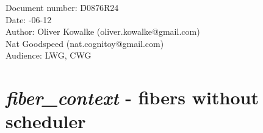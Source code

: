 \documentclass[fontsize=10pt,paper=A4,pagesize,DIV=15]{scrartcl}
\begin{document}
\small
\begin{tabbing}
    Document number: \= D0876R24\\
    Date:            -06-12\\
    Author:          \> Oliver Kowalke (oliver.kowalke@gmail.com)\\
                     \> Nat Goodspeed (nat.cognitoy@gmail.com)\\
    Audience:        \> LWG, CWG\\
\end{tabbing}

\section*{\emph{fiber\_context} - fibers without scheduler}


\tableofcontents




\newpage




























\end{document}
